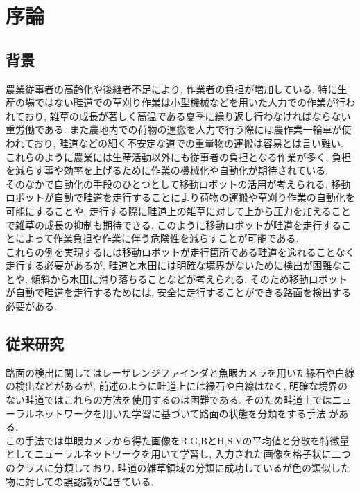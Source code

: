 \chapter{序論}
\section{背景}
農業従事者の高齢化や後継者不足により, 作業者の負担が増加している. 
特に生産の場ではない畦道での草刈り作業は小型機械などを用いた人力での作業が行われており, 
雑草の成長が著しく高温である夏季に繰り返し行わなければならない重労働である. 
また農地内での荷物の運搬を人力で行う際には農作業一輪車が使われており, 
畦道などの細く不安定な道での重量物の運搬は容易とは言い難い. 
これらのように農業には生産活動以外にも従事者の負担となる作業が多く, 
負担を減らす事や効率を上げるために作業の機械化や自動化が期待されている. 
\\そのなかで自動化の手段のひとつとして移動ロボットの活用が考えられる. 
移動ロボットが自動で畦道を走行することにより荷物の運搬や草刈り作業の自動化を可能にすることや, 
走行する際に畦道上の雑草に対して上から圧力を加えることで雑草の成長の抑制も期待できる\cite{稲垣栄洋2017踏圧処理が畦畔雑草植生に及ぼす影響}. 
このように移動ロボットが畦道を走行することによって作業負担や作業に伴う危険性を減らすことが可能である. 
\\これらの例を実現するには移動ロボットが走行箇所である畦道を逸れることなく走行する必要があるが, 
畦道と水田には明確な境界がないために検出が困難なことや, 傾斜から水田に滑り落ちることなどが考えられる. 
そのため移動ロボットが自動で畦道を走行するためには, 安全に走行することができる路面を検出する必要がある.
\section{従来研究}
路面の検出に関してはレーザレンジファインダと魚眼カメラを用いた縁石や白線の検出\cite{土谷千加夫2015自律走行のための白線と縁石に基づく自己位置推定}などがあるが, 
前述のように畦道上には縁石や白線はなく, 明確な境界のない畦道ではこれらの方法を使用するのは困難である. 
そのため畦道上ではニューラルネットワークを用いた学習に基づいて路面の状態を分類をする手法
\cite{長橋孝哉2019ニューラルネットワークを用いた畦道の雑草検出に関する研究}がある.
\\この手法では単眼カメラから得た画像をR,G,BとH,S,Vの平均値と分散を特徴量としてニューラルネットワークを用いて学習し, 
入力された画像を格子状に二つのクラスに分類しており, 畦道の雑草領域の分類に成功しているが色の類似した物に対しての誤認識が起きている.

